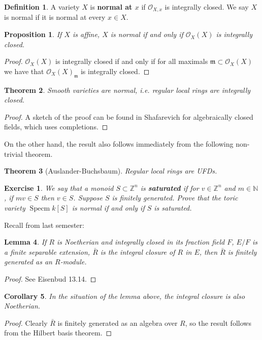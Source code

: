 \documentclass{article}
\newcommand{\Z}{\mathbb{Z}}
\newcommand{\N}{\mathbb{N}}
\newcommand{\fr}{\mathfrak}
\DeclareMathOperator{\Specm}{Specm}
\theoremstyle{plain}
\newtheorem{thm}{Theorem}
\newtheorem{lem}[thm]{Lemma}
\newtheorem{cor}[thm]{Corollary}
\newtheorem{prop}[thm]{Proposition}
\newtheorem{exc}{Exercise}
\theoremstyle{definition}
\newtheorem{defn}{Definition}
\theoremstyle{remark}
\begin{document}
\begin{defn}
    A variety $X$ is \textbf{normal at $x$} if $\mathcal{O}_{X,x}$ is integrally closed.
    We say $X$ is normal if it is normal at every $x\in X$.
\end{defn}

\begin{prop}
    If $X$ is affine, $X$ is normal if and only if $\mathcal{O}_X(X)$ is integrally closed.
\end{prop}
\begin{proof}
    $\mathcal{O}_X(X)$ is integrally closed if and only if for all maximals $\fr m\subset\mathcal{O}_X(X)$
    we have that $\mathcal{O}_X(X)_{\fr m}$ is integrally closed.
\end{proof}

\begin{thm}
    Smooth varieties are normal, i.e. regular local rings are integrally closed.
\end{thm}
\begin{proof}
    A sketch of the proof can be found in Shafarevich for algebraically closed fields,
    which uses completions.
\end{proof}

On the other hand, the result also follows immediately from the
following non-trivial theorem.

\begin{thm}[Auslander-Buchsbaum]
    Regular local rings are UFDs.
\end{thm}

\begin{exc}
    We say that a monoid $S\subset\Z^n$ is \textbf{saturated} if for $v\in\Z^n$
    and $m\in\N$, if $mv\in S$ then $v\in S$. Suppose $S$ is finitely generated.
    Prove that the toric variety $\Specm k[S]$ is normal if and only if $S$ is
    saturated.
\end{exc}

Recall from last semester:

\begin{lem}
    If $R$ is Noetherian and integrally closed in its fraction field $F$,
    $E/F$ is a finite separable extension, $\bar R$ is the integral closure
    of $R$ in $E$, then $\bar R$ is finitely generated as an $R$-module.
\end{lem}
\begin{proof}
    See Eisenbud 13.14.
\end{proof}

\begin{cor}
    In the situation of the lemma above, the integral closure is also
    Noetherian.
\end{cor}
\begin{proof}
    Clearly $\bar R$ is finitely generated as an algebra over $R$, so the
    result follows from the Hilbert basis theorem.
\end{proof}
\end{document}
